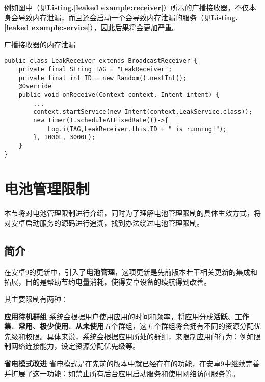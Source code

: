 例如图中（见\textbf{Listing.\textcolor{red}{\ref{leaked example:receiver}}}）所示的广播接收器，不仅本身会导致内存泄漏，而且还会启动一个会导致内存泄漏的服务（见\textbf{Listing.\textcolor{red}{\ref{leaked example:service}}}），因此后果将会更加严重。
\begin{listing}[htbp]
	\centering
	\caption{广播接收器的内存泄漏}
	\begin{verbatim}
public class LeakReceiver extends BroadcastReceiver {
	private final String TAG = "LeakReceiver";
	private final int ID = new Random().nextInt();
	@Override
	public void onReceive(Context context, Intent intent) {
		...
		context.startService(new Intent(context,LeakService.class));
		new Timer().scheduleAtFixedRate(()->{
			Log.i(TAG,LeakReceiver.this.ID + " is running!");
		}, 1000L, 3000L);
	}
}
	\end{verbatim}
	\label{leaked example:receiver}
\end{listing}

\section{电池管理限制}

本节将对电池管理限制进行介绍，同时为了理解电池管理限制的具体生效方式，将对安卓启动服务的源码进行追溯，找到办法绕过电池管理限制。

\subsection{简介}

在安卓9的更新中，引入了\textbf{电池管理}\cite{histroyofpms}，这项更新是先前版本若干相关更新的集成和拓展，目的是帮助节约电量消耗，使得安卓设备的续航得到改善。

其主要限制有两种：

\textbf{应用待机群组} 系统会根据用户使用应用的时间和频率，将应用分成\textbf{活跃}、\textbf{工作集}、\textbf{常用}、\textbf{极少使用}、\textbf{从未使用}五个群组，这五个群组将会拥有不同的资源分配优先级和权限。具体来说，系统会根据应用所处的群组，来限制应用的行为：例如限制网络连接能力，设定资源分配优先级等。
\newline

\textbf{省电模式改进} 省电模式是在先前的版本中就已经存在的功能，在安卓9中继续完善并扩展了这一功能：如禁止所有后台应用启动服务和使用网络访问服务等。


